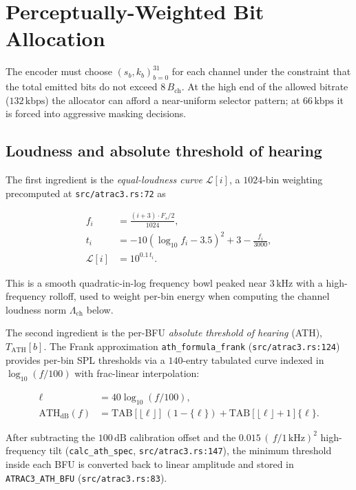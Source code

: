 \documentclass[11pt]{article}
\begin{document}
\section{Perceptually-Weighted Bit Allocation}
\label{sec:bitalloc}

The encoder must choose \((s_b, k_b)_{b=0}^{31}\) for each channel under the
constraint that the total emitted bits do not exceed \(8\,B_{\text{ch}}\). At
the high end of the allowed bitrate (\(132\,\text{kbps}\)) the allocator can
afford a near-uniform selector pattern; at \(66\,\text{kbps}\) it is forced
into aggressive masking decisions.

\subsection{Loudness and absolute threshold of hearing}

The first ingredient is the \emph{equal-loudness curve}
\(\mathcal{L}[i]\), a \(1024\)-bin weighting precomputed at
\texttt{src/atrac3.rs:72} as

\begin{align}
f_i &= \frac{(i+3)\cdot F_s/2}{1024}, \\
t_i &= -10(\log_{10} f_i - 3.5)^2 + 3 - \frac{f_i}{3000}, \\
\mathcal{L}[i] &= 10^{0.1\, t_i}.
\end{align}

\noindent
This is a smooth quadratic-in-log frequency bowl peaked near \(3\,\text{kHz}\)
with a high-frequency rolloff, used to weight per-bin energy when computing
the channel loudness norm \(\Lambda_{\text{ch}}\) below.

The second ingredient is the per-BFU \emph{absolute threshold of hearing}
(ATH), \(T_{\text{ATH}}[b]\). The Frank approximation
\texttt{ath\_formula\_frank} (\texttt{src/atrac3.rs:124}) provides per-bin
SPL thresholds via a \(140\)-entry tabulated curve indexed in
\(\log_{10}(f/100)\) with frac-linear interpolation:

\begin{align}
\ell &= 40\log_{10}(f/100), \\
\text{ATH}_{\text{dB}}(f) &= \mathrm{TAB}[\lfloor\ell\rfloor]\,(1{-}\{\ell\}) + \mathrm{TAB}[\lfloor\ell\rfloor+1]\{\ell\}.
\end{align}

\noindent
After subtracting the \(100\,\text{dB}\) calibration offset and the
\(0.015\,(\,f/1\,\text{kHz})^2\) high-frequency tilt
(\texttt{calc\_ath\_spec}, \texttt{src/atrac3.rs:147}), the minimum threshold
inside each BFU is converted back to linear amplitude and stored in
\texttt{ATRAC3\_ATH\_BFU} (\texttt{src/atrac3.rs:83}).
\end{document}
